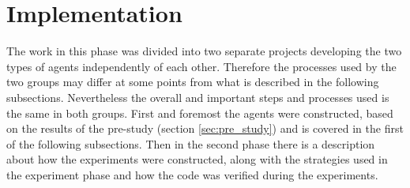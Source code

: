 \section{Implementation }
The work in this phase was divided into two separate projects developing the two types of agents independently of each other. Therefore the processes used by the two groups may differ at some points from what is described in the following subsections. Nevertheless the overall and important steps and processes used is the same in both groups. First and foremost the agents were constructed, based on the results of the pre-study (section \ref{sec:pre_study}) and is covered in the first of the following subsections. Then in the second phase there is a description about how the experiments were constructed, along with the strategies used in the experiment phase and how the code was verified during the experiments.



